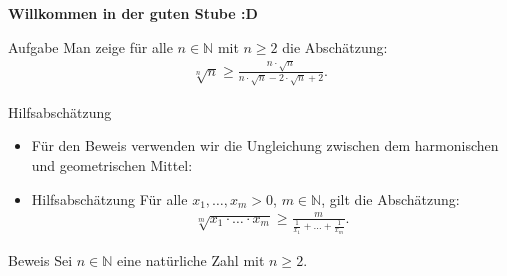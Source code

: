 \documentclass[10pt]{beamer}
\title{}
\author{Artur's Mathematikstübchen}
\date{}
\def\bN{\mathbb{N}}
\begin{document}

\begin{frame}
    \begin{center}
        \textbf{\huge Willkommen in der guten Stube \newline \newline :D}
    \end{center}
\end{frame}




\begin{frame}{}
    \begin{alertblock}{Aufgabe}
        Man zeige für alle \( n \in \bN \) mit \( n \geq 2 \) die Abschätzung:
        \begin{align*}
            \sqrt[n]{n}
        		\geq \frac{n \cdot \sqrt{n}}{n \cdot \sqrt{n} - 2 \cdot \sqrt{n} + 2}.
        \end{align*}
    \end{alertblock}
\end{frame}



\begin{frame}{Hilfsabschätzung}
    \begin{itemize}
        \item<1-> Für den Beweis verwenden wir die Ungleichung zwischen dem harmonischen und geometrischen Mittel: 
        \item<2->
        \begin{block}{Hilfsabschätzung}
            Für alle \( x_{1}, \ldots, x_{m} > 0 \), \( m \in \bN \), gilt die Abschätzung:
            \begin{align*}
                \sqrt[m]{x_{1} \cdot \ldots \cdot x_{m}}
                \geq \frac{m}{\frac{1}{x_{1}} + \ldots + \frac{1}{x_{m}}}.
            \end{align*}
        \end{block}
    \end{itemize}
\end{frame}



\begin{frame}{Beweis}
    Sei \( n \in \bN \) eine natürliche Zahl mit \( n \geq 2 \).
\end{frame}
\end{document}
